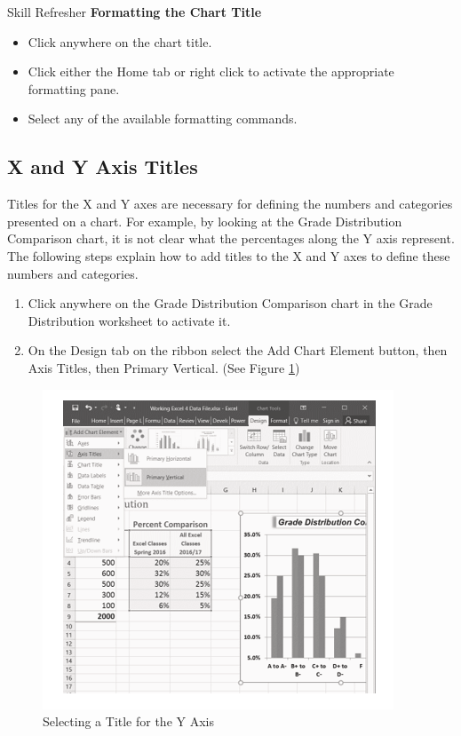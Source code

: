 \begin{center}
	\begin{sklbox}{Skill Refresher}
		\textbf{Formatting the Chart Title}
		\\
		\begin{itemize}
			\setlength{\itemsep}{0pt}
			\setlength{\parskip}{0pt}
			\setlength{\parsep}{0pt}

			\item Click anywhere on the chart title.
			\item Click either the Home tab or right click to activate the appropriate formatting pane.
			\item Select any of the available formatting commands.
			
		\end{itemize}
	\end{sklbox}
\end{center}

\subsection{X and Y Axis Titles}

Titles for the X and Y axes are necessary for defining the numbers and categories presented on a chart. For example, by looking at the Grade Distribution Comparison chart, it is not clear what the percentages along the Y axis represent. The following steps explain how to add titles to the X and Y axes to define these numbers and categories.

\begin{enumerate}
	\item Click anywhere on the Grade Distribution Comparison chart in the Grade Distribution worksheet to activate it.
	\item On the Design tab on the ribbon select the Add Chart Element button, then Axis Titles, then Primary Vertical. (See Figure \ref{04:fig33})
\end{enumerate}

\begin{figure}[H]
	\centering
	\includegraphics[width=\maxwidth{.95\linewidth}]{gfx/ch04_fig33}
	\caption{Selecting a Title for the Y Axis}
	\label{04:fig33}
\end{figure}

